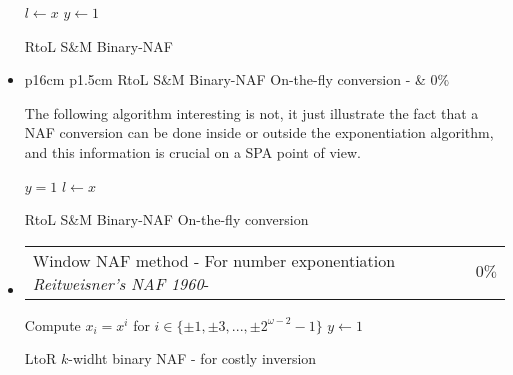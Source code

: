 \begin{itemize}
		\begin{algorithm}[h]
			$l \leftarrow x$ \;		
			$y \leftarrow 1$ \; 
			\;
			\caption{RtoL S\&M Binary-NAF}
			\label{alg:RtoL_SM_On-the-fly_Binary_NAF_conversion}
		\end{algorithm}	

	\item  	
		\begin{tabularx}{\linewidth}{ p{16cm} p{1.5cm}} 
		RtoL S\&M  Binary-NAF On-the-fly conversion 
		-  & $0\%$ \\ 	
		\end{tabularx}	

		The following algorithm interesting is not, it just illustrate the 
	    fact that a NAF conversion can be done inside or outside the exponentiation 
	    algorithm, and this information is crucial on a SPA point of view.
				
		\begin{algorithm}[h]
			$y = 1$ \; $l \leftarrow x$ \;		
			\;
			\caption{RtoL S\&M Binary-NAF On-the-fly conversion}
			\label{alg:RtoL_SM_On-the-fly_Binary_NAF_conversion}
		\end{algorithm}	

\newpage		
	\item  	
		\begin{tabularx}{\linewidth}{ p{16cm} p{1.5cm}}
		Window NAF method - For number exponentiation
		\textit{Reitweisner's NAF 1960}-  & $0\%$ \\ 
			\end{tabularx}
			\begin{algorithm}[h]
						Compute $ x_i =x^i $ for 
						$i\in \{ \pm 1,\pm 3, ..., \pm 2^{\omega-2}-1 \} $	\;
						$y \leftarrow 1$\;					
				\caption{LtoR $k$-widht binary NAF - for costly inversion}
				\label{alg:ary_method_NAF_version_for_coslty_inversion}
			\end{algorithm}	
				

\end{itemize}
